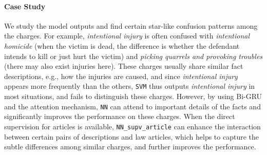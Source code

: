 




\paragraph{Case Study}
We study the model outputs and find certain star-like confusion patterns among the charges. For example, \emph{intentional injury} %
is often confused with %
\emph{intentional homicide} (when the victim is dead, the difference is %
 whether the defendant intends to kill  or just hurt the victim) and \emph{picking quarrels and provoking troubles}
(there may also exist injuries here).
These charges usually share similar fact descriptions, e.g., how the injuries are caused, and since \emph{intentional injury} appears more frequently than the others, \texttt{SVM} thus outputs \emph{intentional injury} in most situations, and fails to distinguish these charges.
However, by using Bi-GRU and the attention mechanism, \texttt{NN} can attend to important details of the facts and significantly improves the performance on these charges.
When the direct supervision for articles is available,  \texttt{NN\_supv\_article}  can enhance the interaction between certain pairs of descriptions and law articles, which helps to capture the subtle differences among similar charges, and further improves the performance.

